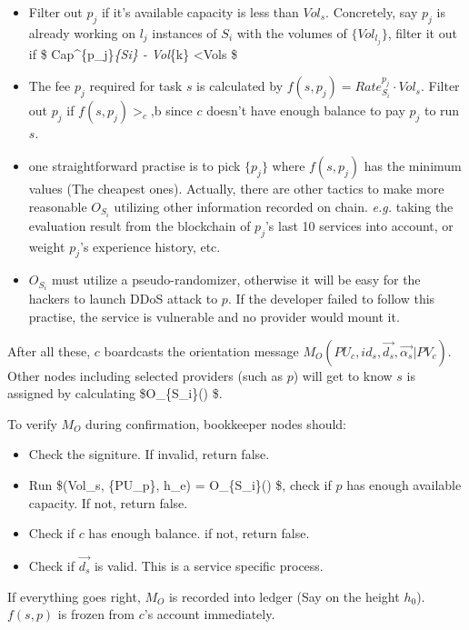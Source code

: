 \documentclass[11pt]{article}
\providecommand{\tightlist}{%
      \setlength{\itemsep}{0pt}\setlength{\parskip}{0pt}}
\def\gt{>}
\def\lt{<}
\begin{document}
\begin{itemize}
\item
  Filter out \(p_j\) if it's available capacity is less than \(Vol_s\).
  Concretely, say \(p_j\) is already working on \(l_j\) instances of
  \(S_i\) with the volumes of \(\{Vol_{l_j}\}\), filter it out if \$
  Cap\^{}\{p\_j\}\emph{\{Si\} - \Sigma Vol}\{k\} \lt Vols \$
\item
  The fee \(p_j​\) required for task \(s​\) is calculated by
  \(f(s,p_j) = Rate_{S_i}^{p_j} \cdot Vol_s​\). Filter out \(p_j​\) if
  \(f(s,p_j) \gt _c​\),b since \(c​\) doesn't have enough balance to pay
  \(p_j​\) to run \(s​\).
\item
  one straightforward practise is to pick \(\{p_j\}\) where \(f(s,p_j)\)
  has the minimum values (The cheapest ones). Actually, there are other
  tactics to make more reasonable \(O_{S_i}\) utilizing other
  information recorded on chain. \emph{e.g.} taking the evaluation
  result from the blockchain of \(p_j\)'s last 10 services into account,
  or weight \(p_j\)'s experience history, etc.
\item
  \(O_{S_i}\) must utilize a pseudo-randomizer, otherwise it will be
  easy for the hackers to launch DDoS attack to \(p\). If the developer
  failed to follow this practise, the service is vulnerable and no
  provider would mount it.
\end{itemize}

After all these, \(c\) boardcasts the orientation message
\(M_{O}(PU_c,id_s, \vec{d_s}, \vec{\alpha_s}|PV_c)\). Other nodes
including selected providers (such as \(p\)) will get to know \(s\) is
assigned by calculating \$O\_\{S\_i\}() \$.

To verify \(M_{O}\) during confirmation, bookkeeper nodes should:

\begin{itemize}
\tightlist
\item
  Check the signiture. If invalid, return false.
\item
  Run \$(Vol\_s, \{PU\_p\}, h\_e) = O\_\{S\_i\}() \$, check if
  \(p\) has enough available capacity. If not, return false.
\item
  Check if \(c\) has enough balance. if not, return false.
\item
  Check if \(\vec{d_s}\) is valid. This is a service specific process.
\end{itemize}

If everything goes right, \(M_{O}\) is recorded into ledger (Say on the
height \(h_0\)). \(f(s,p)\) is frozen from \(c\)'s account immediately.
\end{document}
